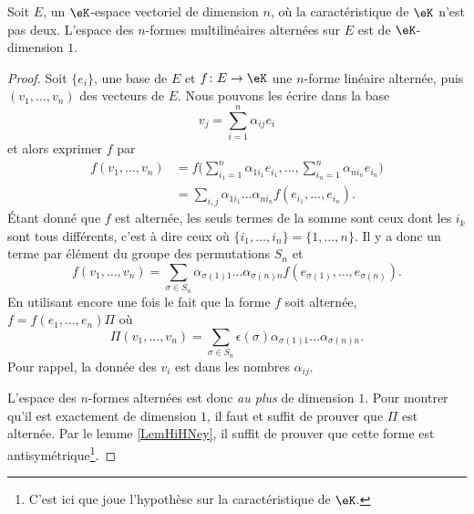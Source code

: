 \begin{proposition} \label{ProprbjihK}
    Soit \( E\), un \( \eK\)-espace vectoriel de dimension \( n\), où la caractéristique de \( \eK\) n'est pas deux. L'espace des \( n\)-formes multilinéaires alternées sur \( E\) est de \( \eK\)-dimension \( 1\).
\end{proposition}

\begin{proof}
    Soit \( \{ e_i \}\), une base de \( E\) et \( f\colon E\to \eK\) une \( n\)-forme linéaire alternée, puis \( (v_1,\ldots, v_n)\) des vecteurs de \( E\). Nous pouvons les écrire dans la base
    \begin{equation}
        v_j=\sum_{i=1}^n\alpha_{ij}e_i
    \end{equation}
    et alors exprimer \( f\) par
    \begin{subequations}
        \begin{align}
            f(v_1,\ldots, v_n)&=f\big( \sum_{i_1=1}^n\alpha_{1i_1}e_{i_1},\ldots, \sum_{i_n=1}^n\alpha_{ni_n}e_{i_n} \big)\\
            &=\sum_{i,j}\alpha_{1i_1}\ldots \alpha_{ni_n}f(e_{i_1},\ldots, e_{i_n}).
        \end{align}
    \end{subequations}
    Étant donné que \( f\) est alternée, les seuls termes de la somme sont ceux dont les \( i_k\) sont tous différents, c'est à dire ceux où \( \{ i_1,\ldots, i_n \}=\{ 1,\ldots, n \}\). Il y a donc un terme par élément du groupe des permutations \( S_n\) et
    \begin{equation}
        f(v_1,\ldots, v_n)=\sum_{\sigma\in S_n}\alpha_{\sigma(1)1}\ldots \alpha_{\sigma(n)n}f(e_{\sigma(1)},\ldots, e_{\sigma(n)}).
    \end{equation}
    En utilisant encore une fois le fait que la forme \( f\) soit alternée, \( f=f(e_1,\ldots, e_n)\Pi\) où
    \begin{equation}
        \Pi(v_1,\ldots, v_n)=\sum_{\sigma\in S_n}\epsilon(\sigma)\alpha_{\sigma(1)1}\ldots \alpha_{\sigma(n)n}.
    \end{equation}
    Pour rappel, la donnée des \( v_i\) est dans les nombres \( \alpha_{ij}\).
    
    L'espace des \( n\)-formes alternées est donc \emph{au plus} de dimension \( 1\). Pour montrer qu'il est exactement de dimension \( 1\), il faut et suffit de prouver que \( \Pi\) est alternée. Par le lemme \ref{LemHiHNey}, il suffit de prouver que cette forme est antisymétrique\footnote{C'est ici que joue l'hypothèse sur la caractéristique de \( \eK\).}. 


\end{proof}
